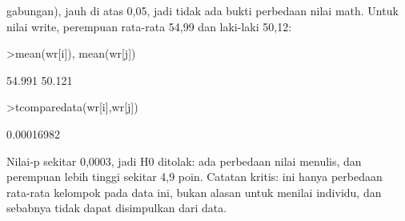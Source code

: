 \documentclass[a4paper,10pt]{article}
\begin{document}
\begin{eulernotebook}
\begin{eulercomment}
\begin{eulercomment}
\begin{eulercomment}
\begin{eulercomment}
\begin{eulercomment}
\begin{eulercomment}
\begin{eulercomment}
\begin{eulercomment}
\begin{eulercomment}
\begin{eulercomment}
\begin{eulercomment}
\begin{eulercomment}
\begin{eulercomment}
\begin{eulercomment}
\begin{eulercomment}
\begin{eulercomment}
\begin{eulercomment}
\begin{eulercomment}
\begin{eulercomment}
\begin{eulercomment}
\begin{eulercomment}
\begin{eulercomment}
\begin{eulercomment}
\begin{eulercomment}
\begin{eulercomment}
\begin{eulercomment}
\begin{eulercomment}
\begin{eulercomment}
\begin{eulercomment}
gabungan), jauh di atas 0,05, jadi tidak ada bukti perbedaan nilai math. Untuk nilai write,
perempuan rata-rata 54,99 dan laki-laki 50,12:
\end{eulercomment}
\begin{eulerprompt}
>mean(wr[i]), mean(wr[j])
\end{eulerprompt}
\begin{euleroutput}
  54.991
  50.121
\end{euleroutput}
\begin{eulerprompt}
>tcomparedata(wr[i],wr[j])
\end{eulerprompt}
\begin{euleroutput}
  0.00016982
\end{euleroutput}
\begin{eulercomment}
Nilai-p sekitar 0,0003, jadi H0 ditolak: ada perbedaan nilai menulis, dan perempuan lebih
tinggi sekitar 4,9 poin. Catatan kritis: ini hanya perbedaan rata-rata kelompok pada data
ini, bukan alasan untuk menilai individu, dan sebabnya tidak dapat disimpulkan dari data.


\end{eulercomment}
\end{eulercomment}
\end{eulercomment}
\end{eulercomment}
\end{eulercomment}
\end{eulercomment}
\end{eulercomment}
\end{eulercomment}
\end{eulercomment}
\end{eulercomment}
\end{eulercomment}
\end{eulercomment}
\end{eulercomment}
\end{eulercomment}
\end{eulercomment}
\end{eulercomment}
\end{eulercomment}
\end{eulercomment}
\end{eulercomment}
\end{eulercomment}
\end{eulercomment}
\end{eulercomment}
\end{eulercomment}
\end{eulercomment}
\end{eulercomment}
\end{eulercomment}
\end{eulercomment}
\end{eulercomment}
\end{eulercomment}
\end{eulernotebook}
\end{document}
